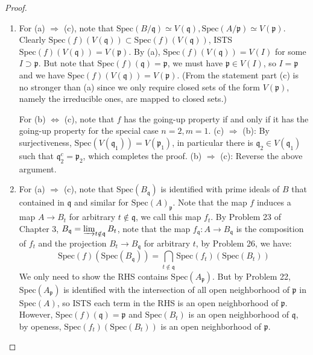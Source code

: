 \documentclass{solution}
\begin{document}
\begin{proof}
    \begin{enumerate}
        \item For (a) $\Rightarrow$ (c), note that $\mathrm{Spec}(B / \mathfrak{q}) \simeq V(\mathfrak{q}), \mathrm{Spec}(A / \mathfrak{p}) \simeq V(\mathfrak{p})$. Clearly $\mathrm{Spec}(f)(V(\mathfrak{q})) \subset \mathrm{Spec}(f) (V(\mathfrak{q}))$, ISTS $\mathrm{Spec}(f)(V(\mathfrak{q})) = V(\mathfrak{p})$. By (a), $\mathrm{Spec}(f)(V(\mathfrak{q})) = V(I)$ for some $I \supset \mathfrak{p}$. But note that $\mathrm{Spec}(f)(\mathfrak{q}) = \mathfrak{p}$, we must have $\mathfrak{p} \in V(I)$, so $I = \mathfrak{p}$ and we have $\mathrm{Spec}(f)(V(\mathfrak{q})) = V(\mathfrak{p})$. ({\color{red}From the statement part (c) is no stronger than (a) since we only require closed sets of the form $V(\mathfrak{p})$, namely the irreducible ones, are mapped to closed sets.})
        
        For (b) $\Leftrightarrow$ (c), note that $f$ has the going-up property if and only if it has the going-up property for the special case $n = 2, m = 1$. (c) $\Rightarrow$ (b): By surjectiveness, $\mathrm{Spec}(V(\mathfrak{q}_1)) = V(\mathfrak{p}_1)$, in particular there is $\mathfrak{q}_2 \in V(\mathfrak{q}_1)$ such that $\mathfrak{q}_2^c = \mathfrak{p}_2$, which completes the proof. (b) $\Rightarrow$ (c): Reverse the above argument.
        
        \item For (a) $\Rightarrow$ (c), note that $\mathrm{Spec}(B_{\mathfrak{q}})$ is identified with prime ideals of $B$ that contained in $\mathfrak{q}$ and similar for $\mathrm{Spec}(A)_{\mathfrak{p}}$. Note that the map $f$ induces a map $A \rightarrow B_t$ for arbitrary $t \notin \mathfrak{q}$, we call this map $f_t$. By Problem 23 of Chapter 3, $B_{\mathfrak{q}} = \varinjlim_{t \notin \mathfrak{q}} B_t$, note that the map $f_{\mathfrak{q}}: A \rightarrow B_{\mathfrak{q}}$ is the composition of $f_t$ and the projection $B_t \rightarrow B_{\mathfrak{q}}$ for arbitrary $t$, by Problem 26, we have:
        $$\mathrm{Spec}(f)(\mathrm{Spec}(B_{\mathfrak{q}})) = \bigcap\limits_{t \notin \mathfrak{q}} \mathrm{Spec}(f_t)(\mathrm{Spec}(B_{t}))$$
        We only need to show the RHS contains $\mathrm{Spec}(A_{\mathfrak{p}})$. But by Problem 22, $\mathrm{Spec}(A_{\mathfrak{p}})$ is identified with the intersection of all open neighborhood of $\mathfrak{p}$ in $\mathrm{Spec}(A)$, so ISTS each term in the RHS is an open neighborhood of $\mathfrak{p}$. However, $\mathrm{Spec}(f)(\mathfrak{q}) = \mathfrak{p}$ and $\mathrm{Spec}(B_t)$ is an open neighborhood of $\mathfrak{q}$, by openess, $\mathrm{Spec}(f_t)(\mathrm{Spec}(B_t))$ is an open neighborhood of $\mathfrak{p}$.
        

\end{enumerate}
\end{proof}
\end{document}
